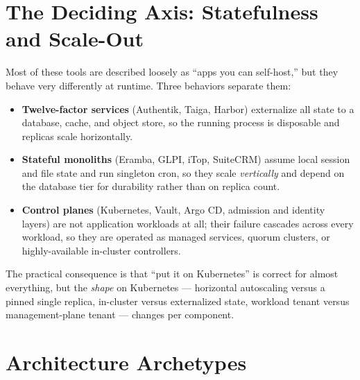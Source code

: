 \documentclass[10pt,letterpaper]{article}
\begin{document}
\section{The Deciding Axis: Statefulness and Scale-Out}

Most of these tools are described loosely as ``apps you can self-host,'' but they behave very differently at runtime. Three behaviors separate them:

\begin{itemize}
  \item \textbf{Twelve-factor services} (Authentik, Taiga, Harbor) externalize all state to a database, cache, and object store, so the running process is disposable and replicas scale horizontally.
  \item \textbf{Stateful monoliths} (Eramba, GLPI, iTop, SuiteCRM) assume local session and file state and run singleton cron, so they scale \emph{vertically} and depend on the database tier for durability rather than on replica count.
  \item \textbf{Control planes} (Kubernetes, Vault, Argo CD, admission and identity layers) are not application workloads at all; their failure cascades across every workload, so they are operated as managed services, quorum clusters, or highly-available in-cluster controllers.
\end{itemize}

The practical consequence is that ``put it on Kubernetes'' is correct for almost everything, but the \emph{shape} on Kubernetes --- horizontal autoscaling versus a pinned single replica, in-cluster versus externalized state, workload tenant versus management-plane tenant --- changes per component.

\section{Architecture Archetypes}
\end{document}
